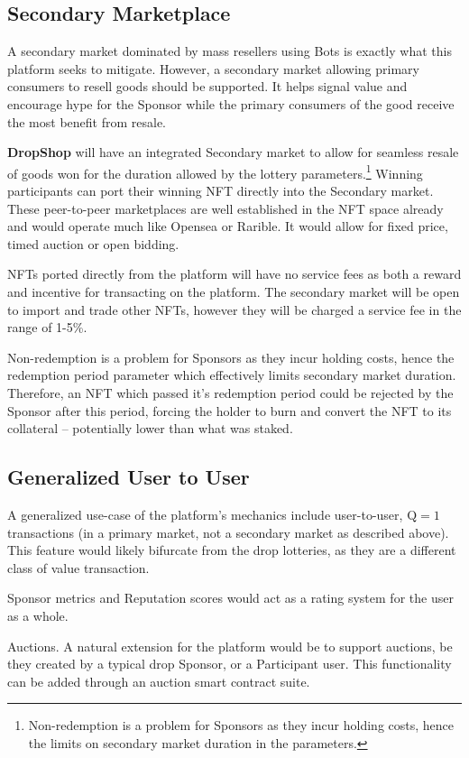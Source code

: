 \documentclass[runningheads]{llncs}
\begin{document}
\subsection{Secondary Marketplace}
A secondary market dominated by mass resellers using Bots is exactly what this platform seeks to mitigate.  However, a secondary market allowing primary consumers to resell goods should be supported.  It helps signal value and encourage hype for the Sponsor while the primary consumers of the good receive the most benefit from resale. 

\textbf{DropShop} will have an integrated Secondary market to allow for seamless resale of goods won for the duration allowed by the lottery parameters.\footnote{Non-redemption is a problem for Sponsors as they incur holding costs, hence the limits on secondary market duration in the parameters.}   Winning participants can port their winning NFT directly into the Secondary market.  These peer-to-peer marketplaces are well established in the NFT space already and would operate much like Opensea or Rarible.  It would allow for fixed price, timed auction or open bidding.

NFTs ported directly from the platform will have no service fees as both a reward and incentive for transacting on the platform.  The secondary market will be open to import and trade other NFTs, however they will be charged a service fee in the range of 1-5\%.

Non-redemption is a problem for Sponsors as they incur holding costs, hence the redemption period parameter which effectively limits secondary market duration.  Therefore, an NFT which passed it’s redemption period could be rejected by the Sponsor after this period, forcing the holder to burn and convert the NFT to its collateral – potentially lower than what was staked.

\subsection{Generalized User to User}
A generalized use-case of the platform’s mechanics include user-to-user, $\mathrm{Q} = 1$ transactions (in a primary market, not a secondary market as described above).    This feature would likely bifurcate from the drop lotteries, as they are a different class of value transaction.  

Sponsor metrics and Reputation scores would act as a rating system for the user as a whole.  

Auctions.  A natural extension for the platform would be to support auctions, be they created by a typical drop Sponsor, or a Participant user.  This functionality can be added through an auction smart contract suite.
\end{document}
